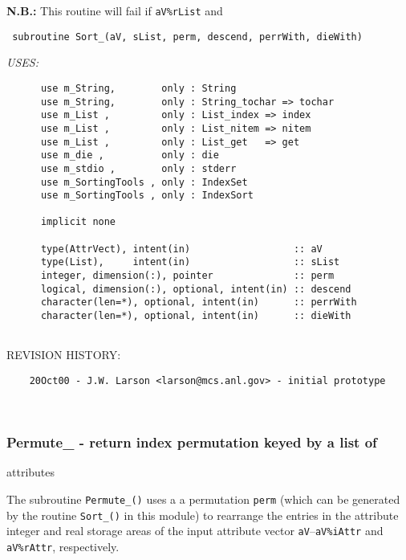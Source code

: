   {\bf N.B.:}  This routine will fail if {\tt aV\%rList} and 
 
\begin{verbatim} 
 subroutine Sort_(aV, sList, perm, descend, perrWith, dieWith)\end{verbatim}{\em USES:}
\begin{verbatim}      use m_String,        only : String
      use m_String,        only : String_tochar => tochar
      use m_List ,         only : List_index => index
      use m_List ,         only : List_nitem => nitem
      use m_List ,         only : List_get   => get
      use m_die ,          only : die
      use m_stdio ,        only : stderr
      use m_SortingTools , only : IndexSet
      use m_SortingTools , only : IndexSort
 
      implicit none
 
      type(AttrVect), intent(in)                  :: aV
      type(List),     intent(in)                  :: sList
      integer, dimension(:), pointer              :: perm
      logical, dimension(:), optional, intent(in) :: descend
      character(len=*), optional, intent(in)      :: perrWith
      character(len=*), optional, intent(in)      :: dieWith
 
 \end{verbatim}{\sf REVISION HISTORY:}
\begin{verbatim}  	20Oct00 - J.W. Larson <larson@mcs.anl.gov> - initial prototype\end{verbatim}
 
 
\mbox{}\hrulefill\ 
 

 \subsubsection{Permute\_ - return index permutation keyed by a list of}


             attributes
 
  The subroutine {\tt Permute\_()} uses a a permutation {\tt perm} (which can
  be generated by the routine {\tt Sort\_()} in this module) to rearrange
  the entries in the attribute integer and real storage areas of the
  input attribute vector {\tt aV}--{\tt aV\%iAttr} and {\tt aV\%rAttr}, 
  respectively.
 
